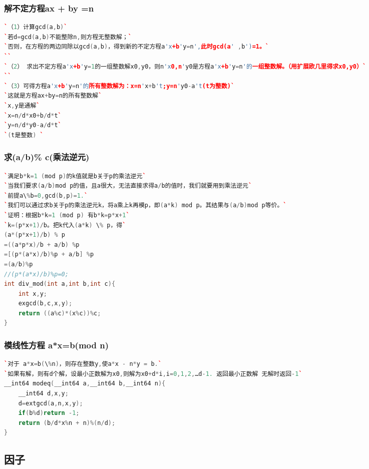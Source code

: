 \documentclass[a4paper]{article}
\begin{document}
\begin{CJK*}{UTF8}{gbsn}
\begin{multicols}{3}
\begin{flushleft}
\subsubsection{解不定方程ax + by =n}
\begin{lstlisting}[language={c++}]
`（1）计算gcd(a,b)`
`若d=gcd(a,b)不能整除n,则方程无整数解；`
`否则，在方程的两边同除以gcd(a,b)，得到新的不定方程a'x+b'y=n',此时gcd(a' ,b')=1。`
``
`（2） 求出不定方程a'x+b'y=1的一组整数解x0,y0，则n'x0,n'y0是方程a'x+b'y=n'的一组整数解。（用扩展欧几里得求x0,y0）`
``
`（3）可得方程a'x+b'y=n'的所有整数解为：x=n'x+b't;y=n'y0-a't(t为整数)`
`这就是方程ax+by=n的所有整数解`
`x,y是通解`
`x=n/d*x0+b/d*t`
`y=n/d*y0-a/d*t`
`(t是整数) `
\end{lstlisting}



\subsubsection{求(a/b)\% c(乘法逆元)}
\begin{lstlisting}[language={c++}]
`满足b*k=1 (mod p)的k值就是b关于p的乘法逆元`
`当我们要求(a/b)mod p的值，且a很大，无法直接求得a/b的值时，我们就要用到乘法逆元`
`前提a\%b=0,gcd(b,p)=1.`
`我们可以通过求b关于p的乘法逆元k，将a乘上k再模p，即(a*k) mod p。其结果与(a/b)mod p等价。`
`证明：根据b*k=1 (mod p) 有b*k=p*x+1`
`k=(p*x+1)/b。把k代入(a*k) \% p，得`
(a*(p*x+1)/b) % p
=((a*p*x)/b + a/b) %p
=[(p*(a*x)/b)%p + a/b] %p
=(a/b)%p
//(p*(a*x)/b)%p=0;
int div_mod(int a,int b,int c){
	int x,y;
	exgcd(b,c,x,y);
	return ((a%c)*(x%c))%c; 
} 
\end{lstlisting}




\subsubsection{模线性方程 a*x=b(mod n)}
\begin{lstlisting}[language={c++}]
`对于 a*x=b(\%n)，则存在整数y,使a*x - n*y = b.`
`如果有解，则有d个解，设最小正数解为x0,则解为x0+d*i,i=0,1,2,…d-1. 返回最小正数解 无解时返回-1`
__int64 modeq(__int64 a,__int64 b,__int64 n){
	__int64 d,x,y;
	d=extgcd(a,n,x,y);
	if(b%d)return -1;
	return (b/d*x%n + n)%(n/d);
}
\end{lstlisting}


\subsection{因子}


\end{flushleft}
\end{multicols}
\end{CJK*}
\end{document}
